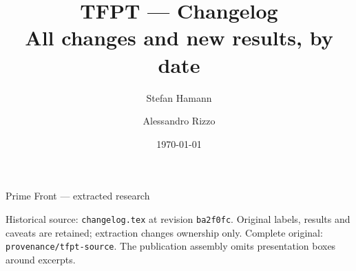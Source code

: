 \documentclass[11pt]{article}
\title{\textbf{TFPT --- Changelog}\\[1mm]\large All changes and new results, by date}
\author{Stefan Hamann \and Alessandro Rizzo}
\date{\today}
\begin{document}
\begin{center}\Large Prime Front --- extracted research\end{center}
\noindent Historical source: \texttt{changelog.tex} at revision \texttt{ba2f0fc}. Original labels, results and caveats are retained; extraction changes ownership only. Complete original: \texttt{provenance/tfpt-source}. The publication assembly omits presentation boxes around excerpts.
\tableofcontents
\clearpage

\end{document}
